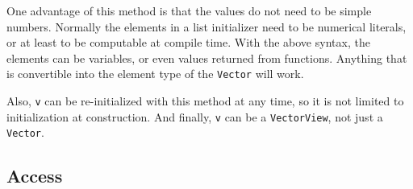 \documentclass[twoside,letterpaper,11pt]{article}
\renewcommand{\tt}[1]{{\lstinline {#1}}}
\begin{document}
One advantage of this method is that the values do not need to be simple numbers.
Normally the elements in a list initializer need to be numerical literals, or at least to be 
computable at compile time.
With the above syntax, the elements can be variables, 
or even values returned from functions.  Anything that is convertible
into the element type of the \tt{Vector} will work.

Also, \tt{v} can be re-initialized with this method at any time, so it is not limited to 
initialization at construction.  And finally, \tt{v} can be a \tt{VectorView}, not just a \tt{Vector}.

\subsection{Access}
\label{vectoraccess}
\end{document}
